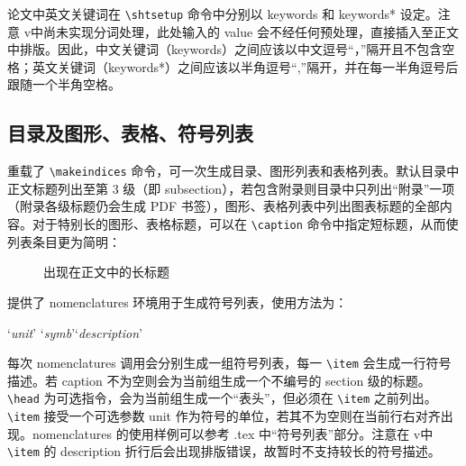\documentclass[bachelor, comfort]{shtthesis}
\begin{document}
论文中英文关键词在 \verb|\shtsetup| 命令中分别以 keywords 和 keywords* 设定。注意 \shtthesis v\version 中尚未实现分词处理，此处输入的 value 会不经任何预处理，直接插入至正文中排版。因此，中文关键词（keywords）之间应该以中文逗号“，”隔开且不包含空格；英文关键词（keywords*）之间应该以半角逗号“,”隔开，并在每一半角逗号后跟随一个半角空格。
\begin{latex}
\end{latex}

\subsection{目录及图形、表格、符号列表}
\shtthesis 重载了 \verb|\makeindices| 命令，可一次生成目录、图形列表和表格列表。默认目录中正文标题列出至第 3 级（即 subsection），若包含附录则目录中只列出“附录”一项（附录各级标题仍会生成 PDF 书签），图形、表格列表中列出图表标题的全部内容。对于特别长的图形、表格标题，可以在 \verb|\caption| 命令中指定短标题，从而使列表条目更为简明：
\begin{latex}
\begin{figure}
  \caption[出现在图形列表内的短标题]{出现在正文中的长标题}
\end{figure}
\end{latex}

\shtthesis 提供了 nomenclatures 环境用于生成符号列表，使用方法为：
\begin{latex}
\begin{nomenclatures}
  \item[`\emph{unit}']{`\emph{symb}'}{`\emph{description}'}
\end{nomenclatures}
\end{latex}
每次 nomenclatures 调用会分别生成一组符号列表，每一 \verb|\item| 会生成一行符号描述。若 caption 不为空则会为当前组生成一个不编号的 section 级的标题。\verb|\head| 为可选指令，会为当前组生成一个“表头”，但必须在 \verb|\item| 之前列出。\verb|\item| 接受一个可选参数 unit 作为符号的单位，若其不为空则在当前行右对齐出现。nomenclatures 的使用样例可以参考 \jobname.tex 中“符号列表”部分。注意在 \shtthesis v\version 中 \verb|\item| 的 description 折行后会出现排版错误，故暂时不支持较长的符号描述。
\end{document}
